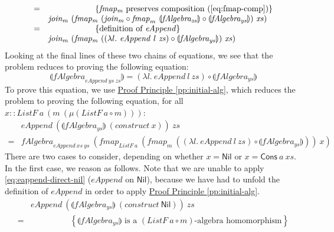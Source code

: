 \documentclass{jfp1}
\newcommand{\fold}[1]{\llparenthesis #1 \rrparenthesis}
\newcommand{\eqAnnotation}[1]{\hspace{2cm}\left\{\textrm{#1}\right\}}
\newcommand{\proofprinref}[1]{\hyperref[#1]{Proof Principle \ref*{#1}}}
\begin{document}
\begin{proof*}
\begin{displaymath}
\begin{array}{cl}
      =&\eqAnnotation{$\mathit{fmap_m}$ preserves composition (\autoref{eq:fmap-comp})} \\
      &\mathit{join_m}~(\mathit{fmap_m}~(\mathit{join_m} \circ \mathit{fmap}_m~\fold{\mathit{fAlgebra_{zs}}} \circ \fold{\mathit{fAlgebra_{ys}}})~\mathit{xs}) \\
      =&\eqAnnotation{definition of $\mathit{eAppend}$} \\
      &\mathit{join_m}~(\mathit{fmap_m}~((\lambda l.~\mathit{eAppend}~l~\mathit{zs}) \circ \fold{\mathit{fAlgebra_{ys}}})~\mathit{xs})
    \end{array}
  \end{displaymath}
  Looking at the final lines of these two chains of equations, we see
  that the problem reduces to proving the following equation:
  \begin{displaymath}
    \fold{\mathit{fAlgebra}_{\mathit{eAppend}~\mathit{ys}~\mathit{zs}}} = (\lambda l.~\mathit{eAppend}~l~\mathit{zs}) \circ \fold{\mathit{fAlgebra_{ys}}}
  \end{displaymath}
  To prove this equation, we use \proofprinref{pp:initial-alg}, which
  reduces the problem to proving the following equation, for all $x ::
  \mathit{ListF}~a~(m~(\mu(\mathit{ListF}~a \circ m)))$:
  \begin{displaymath}
    \begin{array}{cl}
      &\mathit{eAppend}~(\fold{\mathit{fAlgebra_{ys}}}~(\mathit{construct}~x))~\mathit{zs} \\
      =& \mathit{fAlgebra}_{\mathit{eAppend}~\mathit{xs}~\mathit{ys}}~(\mathit{fmap}_{\mathit{ListF}~a}~(\mathit{fmap}_m~((\lambda l.~\mathit{eAppend}~l~\mathit{zs}) \circ \fold{\mathit{fAlgebra_{ys}}}))~x)
    \end{array}
  \end{displaymath}
  There are two cases to consider, depending on whether $x =
  \mathsf{Nil}$ or $x = \mathsf{Cons}~a~\mathit{xs}$. In the first
  case, we reason as follows. Note that we are unable to apply
  \autoref{eq:eappend-direct-nil} ($\mathit{eAppend}$ on
  $\mathsf{Nil}$), because we have had to unfold the definition of
  $\mathit{eAppend}$ in order to apply \proofprinref{pp:initial-alg}.
  \begin{displaymath}
    \begin{array}{cl}
      &\mathit{eAppend}~(\fold{\mathit{fAlgebra_{ys}}}~(\mathit{construct}~\mathsf{Nil}))~\mathit{zs} \\
      =&\eqAnnotation{$\fold{\mathit{fAlgebra_{ys}}}$ is a $(\mathit{ListF}~a \circ m)$-algebra homomorphism} \\

\end{array}
\end{displaymath}
\end{proof*}
\end{document}
